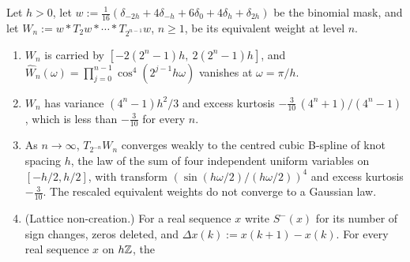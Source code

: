 \begin{proposition}
\label{prop:classical-pyramids-approximate}
\leanok
{}
Let $h > 0$, let
$w := \tfrac1{16}(\delta_{-2h} + 4\delta_{-h} + 6\delta_0 + 4\delta_h + \delta_{2h})$ be the binomial
mask, and let $W_n := w * T_2w * \cdots * T_{2^{n-1}}w$, $n \ge 1$, be its equivalent weight at level
$n$.
\begin{enumerate}
\item $W_n$ is carried by $[-2(2^n - 1)h,\ 2(2^n - 1)h]$, and
$\widehat W_n(\omega) = \prod_{j=0}^{n-1}\cos^4(2^{j-1}h\omega)$ vanishes at $\omega = \pi/h$.
\item $W_n$ has variance $(4^n - 1)h^2/3$ and excess kurtosis
$-\tfrac{3}{10}\,(4^n + 1)/(4^n - 1)$, which is less than $-\tfrac3{10}$ for every $n$.
\item As $n \to \infty$, $T_{2^{-n}}W_n$ converges weakly to the centred cubic B-spline of knot
spacing $h$, the law of the sum of four independent uniform variables on $[-h/2, h/2]$, with
transform $(\sin(h\omega/2)/(h\omega/2))^4$ and excess kurtosis $-\tfrac3{10}$. The rescaled
equivalent weights do not converge to a Gaussian law.
\item (Lattice non-creation.) For a real sequence $x$ write $S^-(x)$ for its number of sign changes,
zeros deleted, and $\Delta x(k) := x(k+1) - x(k)$. For every real sequence $x$ on $h\mathbb{Z}$, the

\end{enumerate}
\end{proposition}
